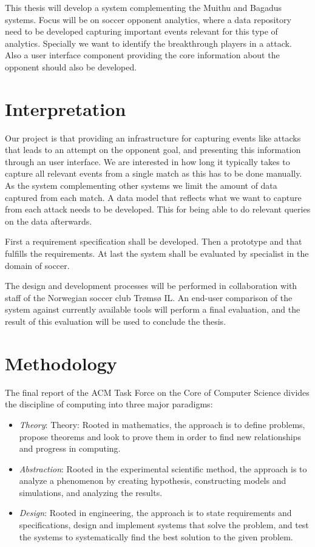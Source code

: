 This thesis will develop a system complementing the Muithu and Bagadus systems. Focus will be on soccer opponent analytics, where a data repository need to be developed capturing important events relevant for this type of analytics. Specially we want to identify the breakthrough players in a attack. Also a user interface component providing the core information about the opponent should also be developed.

\section{Interpretation}

Our project is that providing an infrastructure for capturing events like attacks that leads to an attempt on the opponent goal, and presenting this information through an user interface. We are interested in how long it typically takes to capture all relevant events from a single match as this has to be done manually. As the system complementing other systems we limit the amount of data captured from each match. A data model that reflects what we want to capture from each attack needs to be developed. This for being able to do relevant queries on the data afterwards.

First a requirement specification shall be developed. Then a prototype and that fulfills the requirements. At last the system shall be evaluated by  specialist in the domain of soccer.

The design and development processes will be performed in collaboration with staff of the Norwegian soccer club Trømsø IL. An end-user comparison of the system against currently available tools will perform a final evaluation, and the result of this evaluation will be used to conclude the thesis.

\section{Methodology}

The final report of the ACM Task Force on the Core of Computer Science \cite{computing_as_a_discipline} divides the discipline of computing into three major paradigms:

\begin{itemize}
\item \emph{Theory}: 
Theory: Rooted in mathematics, the approach is to define problems, propose theorems and look to prove them in order to find new relationships and progress in computing.
  
\item \emph{Abstraction}: 
Rooted in the experimental scientific method, the approach is to analyze a phenomenon by creating hypothesis, constructing models and simulations, and analyzing the results.
  
\item \emph{Design}: 
Rooted in engineering, the approach is to state requirements and specifications, design and implement systems that solve the problem, and test the systems to systematically find the best solution to the given problem.

\end{itemize}

